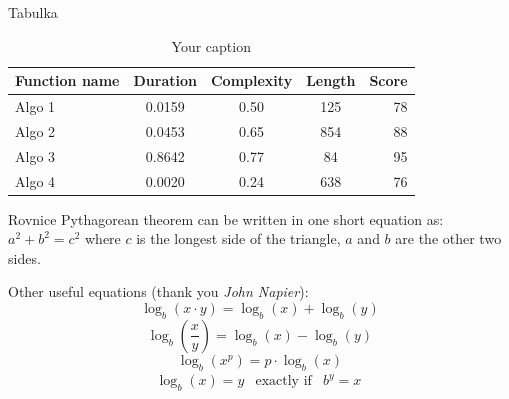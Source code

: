 \documentclass[aspectratio=1610]{beamer}
\begin{document}
\begin{frame}{Tabulka}
    \begin{center}
        \begin{table}
            \caption{Your caption}
            \begin{tabular}{l | c | c | c | r}
                \textbf{Function name} & \textbf{Duration} & \textbf{Complexity} & \textbf{Length} & \textbf{Score}\\
                \hline \hline
                Algo 1 & 0.0159 & 0.50 & 125 & 78 \\
                Algo 2 & 0.0453 & 0.65 & 854 & 88 \\
                Algo 3 & 0.8642 & 0.77 &  84 & 95 \\
                Algo 4 & 0.0020 & 0.24 & 638 & 76 \\
            \end{tabular}
        \end{table}
    \end{center}
\end{frame}

\begin{frame}{Rovnice}
    Pythagorean theorem can be written in one short equation as: $a^2 + b^2 = c^2$ where $c$ is the longest side of the triangle, $a$ and $b$ are the other two sides.

    \vfill %

    Other useful equations (thank you \textit{John Napier}):
    \begin{equation}
        \log_b (x\cdot y) = \log_b (x) + \log_b (y)
    \end{equation}
    \begin{equation}
        \log_b \left( \frac{x}{y} \right) = \log_b (x) - \log_b (y)
    \end{equation}
    \begin{equation}
        \log_b (x^p) = p\cdot \log_b (x)
    \end{equation}
    \begin{eqnarray}
        \log_b(x) = y & \text{exactly if} & b^y = x\
    \end{eqnarray}
\end{frame}
\end{document}
